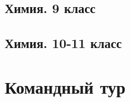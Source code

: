 \documentclass[a4paper,12pt,oneside]{book}
\begin{document}
\section{Химия. 9 класс}


\section{Химия. 10-11 класс}


\chapter{Командный тур}

\end{document}
